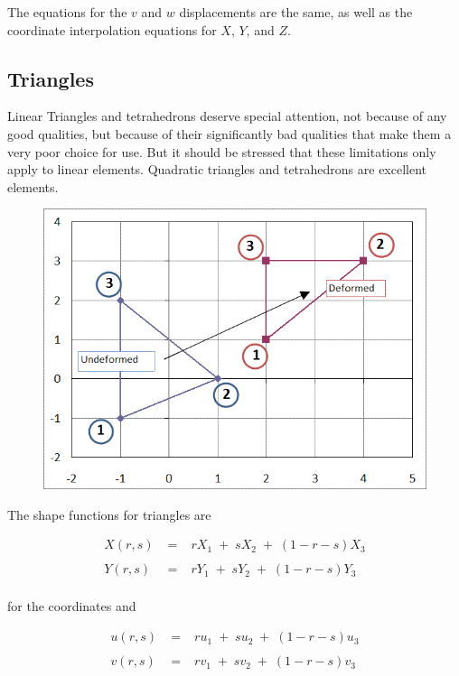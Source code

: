 The equations for the $ v $ and $ w $ displacements are the same, as well as the coordinate interpolation equations for $ X $, $ Y $, and $ Z $.

\subsection{Triangles}
Linear Triangles and tetrahedrons deserve special attention, not because of any good qualities, but because of their significantly bad qualities that make them a very poor choice for use.  But it should be stressed that these limitations only apply to linear elements. Quadratic triangles and tetrahedrons are excellent elements.

\begin{figure}[h]
\centering
\includegraphics[width=0.7\linewidth]{figure/triangle_element}
\caption{}
\label{fig:triangle_element}
\end{figure}

The shape functions for triangles are

\begin{eqnarray*}
X(r,s) & \; = \; & r X_1 \; + \; s X_2 \; + \; (1 - r - s) X_3 \\
\\
Y(r,s) & \; = \; & r Y_1 \; + \; s Y_2 \; + \; (1 - r - s) Y_3 \\
\end{eqnarray*}

for the coordinates and 

\begin{eqnarray*}
u(r,s) & \; = \; & r u_1 \; + \; s u_2 \; + \; (1 - r - s) u_3 \\
\\
v(r,s) & \; = \; & r v_1 \; + \; s v_2 \; + \; (1 - r - s) v_3 \\
\end{eqnarray*}

